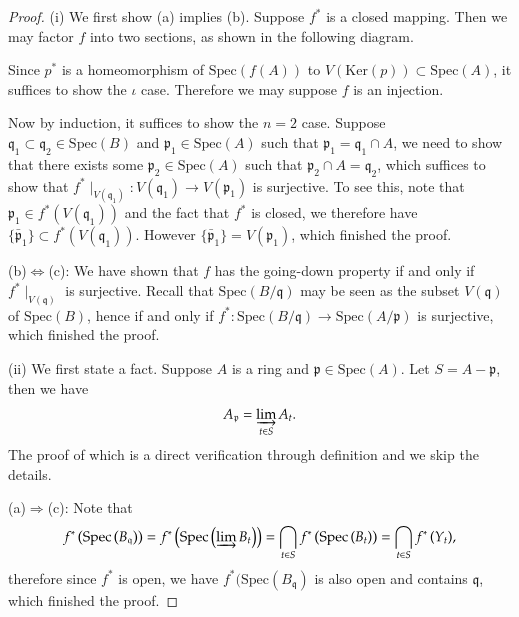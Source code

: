 \begin{proof}
(i) We first show (a) implies (b). Suppose $f^*$ is a closed mapping. Then we may factor $f$ into two sections, as shown in the following diagram.
\begin{center}
\end{center}
Since $p^*$ is a homeomorphism of $\mathrm{Spec}(f(A))$ to $V(\mathrm{Ker}(p))\subset\mathrm{Spec}(A)$, it suffices to show the $\iota$ case. Therefore we may suppose $f$ is an injection.\par
Now by induction, it suffices to show the $n=2$ case. Suppose $\mathfrak{q}_1\subset\mathfrak{q}_2\in\mathrm{Spec}(B)$ and $\mathfrak{p}_1\in\mathrm{Spec}(A)$ such that $\mathfrak{p}_1=\mathfrak{q}_1\cap A$, we need to show that there exists some $\mathfrak{p}_2\in\mathrm{Spec}(A)$ such that $\mathfrak{p}_2\cap A=\mathfrak{q}_2$, which suffices to show that $f^*\mid_{V(\mathfrak{q}_1)}:V(\mathfrak{q}_1)\to V(\mathfrak{p}_1)$ is surjective. To see this, note that $\mathfrak{p}_1\in f^*(V(\mathfrak{q}_1))$ and the fact that $f^*$ is closed, we therefore have $\{\bar{\mathfrak{p}}_1\}\subset f^*(V(\mathfrak{q}_1))$. However $\{\bar{\mathfrak{p}}_1\}=V(\mathfrak{p}_1)$, which finished the proof.\par
(b)$\Leftrightarrow$(c): We have shown that $f$ has the going-down property if and only if $f^*\mid_{V(\mathfrak{q})}$ is surjective. Recall that $\mathrm{Spec}(B/\mathfrak{q})$ may be seen as the subset $V(\mathfrak{q})$ of $\mathrm{Spec}(B)$, hence if and only if $f^*:\mathrm{Spec}(B/\mathfrak{q})\to\mathrm{Spec}(A/\mathfrak{p})$ is surjective, which finished the proof.\par
(ii) We first state a fact. Suppose $A$ is a ring and $\mathfrak{p}\in\mathrm{Spec}(A)$. Let $S=A-\mathfrak{p}$, then we have 
$$
A_\mathfrak{p}=\varinjlim_{t\in S}A_t.
$$
The proof of which is a direct verification through definition and we skip the details.\par
(a)$\Rightarrow$(c): Note that 
$$
f^*\left( \mathrm{Spec}\left( B_{\mathfrak{q}} \right) \right) =f^*\left( \mathrm{Spec}\left( \varinjlim B_t \right) \right) =\bigcap_{t\in S}{f^*\left( \mathrm{Spec}\left( B_t \right) \right)}=\bigcap_{t\in S}{f^*\left( Y_t \right)},
$$
therefore since $f^*$ is open, we have $f^*(\mathrm{Spec}(B_\mathfrak{q})$ is also open and contains $\mathfrak{q}$, which finished the proof.
\end{proof}
